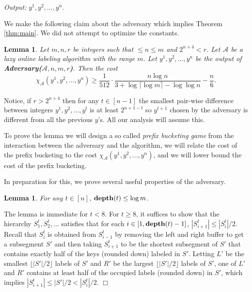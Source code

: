\documentclass[11pt]{article}
\newtheorem{lemma}[theorem]{Lemma}
\newcommand{\qed}{$\Box$}
\newenvironment{proof}{\noindent {\bf Proof:}}{\hfill \qed \smallskip}
\newcommand{\A}{\mathcal{A}}
\newcommand{\depth}{{\rm {\bf depth}}}
\begin{document}
\noindent\emph{Output:} $y^1,y^2,\dotsc,y^n$.

\medskip
We make the following claim about the adversary which implies Theorem \ref{thm:main}. We did not attempt to optimize
the constants.

\begin{lemma}\label{l-main}
Let $m,n,r$ be integers such that %
$\le n \le m$ %
and $2^{n+4}<r$. %
Let $\A$ be a lazy online labeling algorithm with the range $m$.
Let $y^1,y^2,\dotsc,y^n$ be the output of {\bf Adversary($\A,n,m,r$)}.
Then the cost $$\chi_\A(y^1,y^2,\dotsc,y^n) \ge \frac{1}{512} \cdot \frac{n \log n}{ 3 + \log \lceil \log m \rceil - \log \log n} - \frac{n}{6}.$$
\end{lemma}

%

Notice, if $r>2^{n+4}$ then for any $t\in[n-1]$ the smallest pair-wise difference between integers $y^1,y^2,\dotsc,y^t$ is
at least $2^{n+1-t}$ so $y^{t+1}$ chosen by the adversary is different from all the previous $y$'s. All our analysis will assume
this.

To prove the lemma we will design a so called \emph{prefix bucketing game} from the interaction between the
adversary and the algorithm, we will relate the cost of the prefix bucketing to the cost $\chi_\A(y^1,y^2,\dotsc,y^n)$,
and we will lower bound the cost of the prefix bucketing.

In preparation for this, we prove several useful properties of the adversary.

\begin{lemma}
For any $t\in [n]$, $\depth(t)\le \log m$.
\end{lemma}

\begin{proof}
The lemma is immediate for $t <8$.
For $t\ge 8$, it suffices to show that the hierarchy $S^t_1,S^t_2,\ldots$ satisfies that for each $i \in [1,\depth(t)-1]$,
$|S^t_{i+1}| \leq |S^t_{i}|/2$.  Recall that $S^t_i$ is obtained from $S^t_{i-1}$ by removing the left and right
buffer to get a subsegment $S'$ and then taking $S^t_{i+1}$ to be the shortest subsegment of $S'$ that contains
exactly half of the keys (rounded down) labeled in $S'$.  Letting $L'$ be the smallest $\lfloor |S'|/2 \rfloor$
labels of $S'$ and $R'$ be the largest $\lfloor |S'|/2 \rfloor$ labels of $S'$, one of $L'$ and $R'$ contains
at least half of the occupied labels (rounded down) in $S'$, which implies $|S^t_{i+1}| \leq |S'|/2 < |S^t_i|/2$.
\end{proof}
\end{document}
